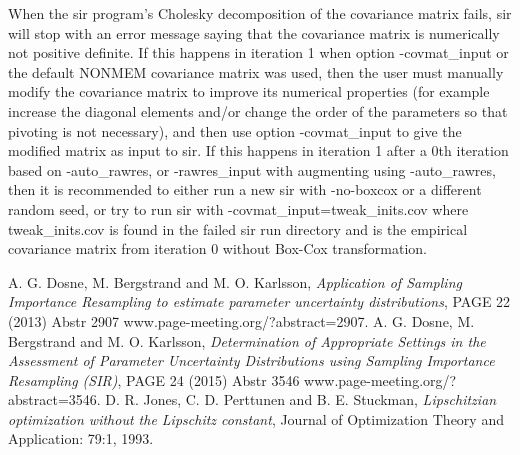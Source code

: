 When the sir program's Cholesky decomposition of the covariance matrix fails, 
sir will stop with an error message saying that the covariance matrix is numerically not positive definite. 
If this happens in iteration 1 when option -covmat\_input or the default NONMEM covariance matrix was used, 
then the user must manually modify the covariance matrix to improve its numerical properties (for example increase the diagonal elements
and/or change the order of the parameters so that pivoting is not necessary),
and then use option -covmat\_input to give the modified matrix as input to sir. 
If this happens in iteration 1 after a 0th iteration based on -auto\_rawres, or -rawres\_input with augmenting using -auto\_rawres, 
then it is recommended to either run a new sir with -no-boxcox or a different random seed, or 
try to run sir with -covmat\_input=tweak\_inits.cov where tweak\_inits.cov is found in the failed sir run directory and
is the empirical covariance matrix from iteration 0 without Box-Cox transformation.


\begin{thebibliography}{99}
 A. G. Dosne, M. Bergstrand and M. O. Karlsson, 
{\em Application of Sampling Importance Resampling to estimate parameter uncertainty distributions},
PAGE 22 (2013) Abstr 2907 \mbox{www.page-meeting.org/?abstract=2907}.
 A. G. Dosne, M. Bergstrand and M. O. Karlsson, 
{\em Determination of Appropriate Settings in the Assessment of Parameter Uncertainty Distributions 
using Sampling Importance Resampling (SIR)},
PAGE 24 (2015) Abstr 3546 \mbox{www.page-meeting.org/?abstract=3546}.
 D. R. Jones, C. D. Perttunen and B. E. Stuckman, {\em Lipschitzian optimization without the Lipschitz constant},
Journal of Optimization Theory and Application: 79:1, 1993.
\end{thebibliography}




